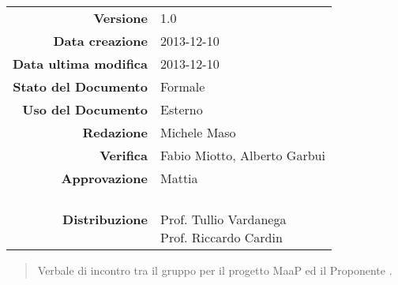 
\newcommand{\Versione}{1.0}							%
\newcommand{\Data}{2013-12-10}						%
\newcommand{\DataUltimaModifica}{2013-12-10}
\newcommand{\TipoDocumento}{Verbale esterno 2013-12-05}		%




\begin{center}
\begin{tabular}{r|l}
\textbf{Versione} & \Versione{} \\
\textbf{Data creazione} & \Data{} \\
\textbf{Data ultima modifica} & \DataUltimaModifica{} \\
\textbf{Stato del Documento} & Formale \\		%
\textbf{Uso del Documento} & Esterno \\			%
\textbf{Redazione} & Michele Maso\\				%
\textbf{Verifica} & Fabio Miotto, Alberto Garbui\\%
\textbf{Approvazione} & Mattia\\				%
\textbf{Distribuzione} & \parbox[t]{4cm}{\NomeGruppo{} \\ Prof. Tullio Vardanega \\ Prof. Riccardo Cardin \\ \Prop{} }\\
\end{tabular}
\end{center}

\vspace{0.05in}

\begin{abstract}
\begin{center}
Verbale di incontro tra il gruppo \NomeGruppo{} per il progetto MaaP ed il Proponente \Prop{}.
\end{center}
\end{abstract}

